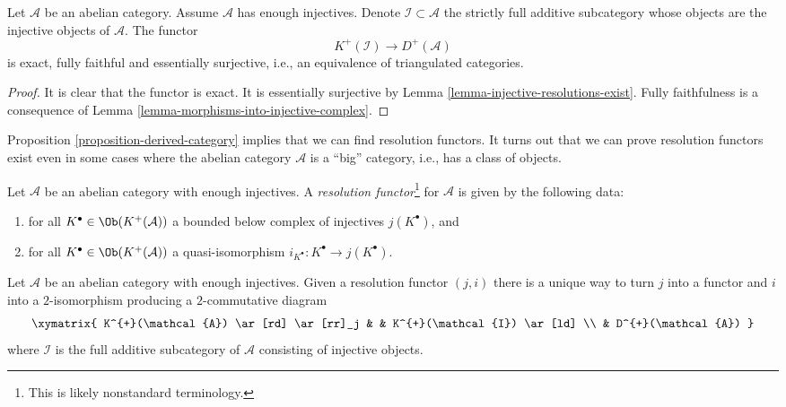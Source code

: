 \begin{proposition}
\label{proposition-derived-category}
Let $\mathcal{A}$ be an abelian category.
Assume $\mathcal{A}$ has enough injectives.
Denote $\mathcal{I} \subset \mathcal{A}$ the strictly full
additive subcategory whose objects are the injective objects of
$\mathcal{A}$.
The functor
$$
K^{+}(\mathcal{I}) \longrightarrow D^{+}(\mathcal{A})
$$
is exact, fully faithful and essentially surjective, i.e.,
an equivalence of triangulated categories.
\end{proposition}

\begin{proof}
It is clear that the functor is exact.
It is essentially surjective by
Lemma \ref{lemma-injective-resolutions-exist}.
Fully faithfulness is a consequence of
Lemma \ref{lemma-morphisms-into-injective-complex}.
\end{proof}

\noindent
Proposition \ref{proposition-derived-category}
implies that we can find resolution functors.
It turns out that we can prove resolution functors exist
even in some cases where the abelian category $\mathcal{A}$ is
a ``big'' category, i.e., has a class of objects.

\begin{definition}
\label{definition-localization-functor}
Let $\mathcal{A}$ be an abelian category with enough injectives.
A {\it resolution functor}\footnote{This is likely nonstandard terminology.}
for $\mathcal{A}$ is given by the following data:
\begin{enumerate}
\item for all $K^\bullet \in \Ob(K^{+}(\mathcal{A}))$ a
bounded below complex of injectives $j(K^\bullet)$, and
\item for all $K^\bullet \in \Ob(K^{+}(\mathcal{A}))$ a
quasi-isomorphism $i_{K^\bullet} : K^\bullet \to j(K^\bullet)$.
\end{enumerate}
\end{definition}

\begin{lemma}
\label{lemma-resolution-functor}
Let $\mathcal{A}$ be an abelian category with enough injectives.
Given a resolution functor $(j, i)$ there is a unique way to
turn $j$ into a functor and $i$ into a $2$-isomorphism
producing a $2$-commutative diagram
$$
\xymatrix{
K^{+}(\mathcal{A}) \ar[rd] \ar[rr]_j & & K^{+}(\mathcal{I}) \ar[ld] \\
& D^{+}(\mathcal{A})
}
$$
where $\mathcal{I}$ is the full additive subcategory of $\mathcal{A}$
consisting of injective objects.
\end{lemma}

